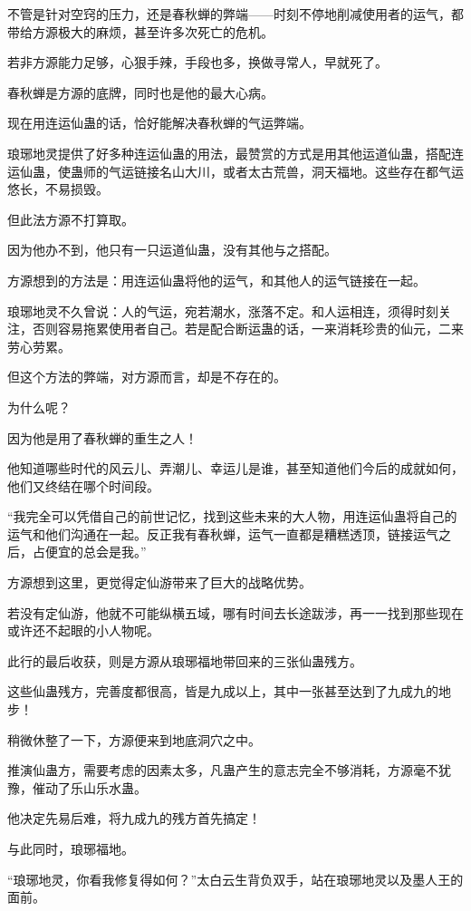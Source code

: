 \begin{this_body}
不管是针对空窍的压力，还是春秋蝉的弊端——时刻不停地削减使用者的运气，都带给方源极大的麻烦，甚至许多次死亡的危机。

若非方源能力足够，心狠手辣，手段也多，换做寻常人，早就死了。

春秋蝉是方源的底牌，同时也是他的最大心病。

现在用连运仙蛊的话，恰好能解决春秋蝉的气运弊端。

琅琊地灵提供了好多种连运仙蛊的用法，最赞赏的方式是用其他运道仙蛊，搭配连运仙蛊，使蛊师的气运链接名山大川，或者太古荒兽，洞天福地。这些存在都气运悠长，不易损毁。

但此法方源不打算取。

因为他办不到，他只有一只运道仙蛊，没有其他与之搭配。

方源想到的方法是：用连运仙蛊将他的运气，和其他人的运气链接在一起。

琅琊地灵不久曾说：人的气运，宛若潮水，涨落不定。和人运相连，须得时刻关注，否则容易拖累使用者自己。若是配合断运蛊的话，一来消耗珍贵的仙元，二来劳心劳累。

但这个方法的弊端，对方源而言，却是不存在的。

为什么呢？

因为他是用了春秋蝉的重生之人！

他知道哪些时代的风云儿、弄潮儿、幸运儿是谁，甚至知道他们今后的成就如何，他们又终结在哪个时间段。

“我完全可以凭借自己的前世记忆，找到这些未来的大人物，用连运仙蛊将自己的运气和他们沟通在一起。反正我有春秋蝉，运气一直都是糟糕透顶，链接运气之后，占便宜的总会是我。”

方源想到这里，更觉得定仙游带来了巨大的战略优势。

若没有定仙游，他就不可能纵横五域，哪有时间去长途跋涉，再一一找到那些现在或许还不起眼的小人物呢。

此行的最后收获，则是方源从琅琊福地带回来的三张仙蛊残方。

这些仙蛊残方，完善度都很高，皆是九成以上，其中一张甚至达到了九成九的地步！

稍微休整了一下，方源便来到地底洞穴之中。

推演仙蛊方，需要考虑的因素太多，凡蛊产生的意志完全不够消耗，方源毫不犹豫，催动了乐山乐水蛊。

他决定先易后难，将九成九的残方首先搞定！

与此同时，琅琊福地。

“琅琊地灵，你看我修复得如何？”太白云生背负双手，站在琅琊地灵以及墨人王的面前。


\end{this_body}
